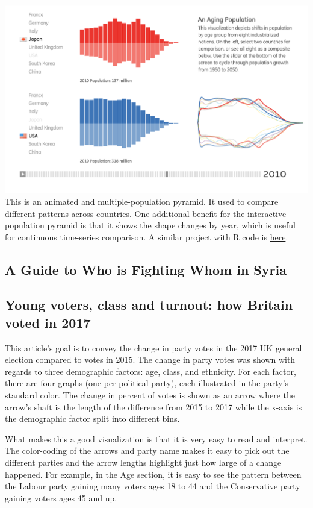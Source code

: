 \documentclass[]{book}
\theoremstyle{definition}
\theoremstyle{definition}
\theoremstyle{definition}
\theoremstyle{remark}
\begin{document}
\includegraphics{images/3_1.png} This is an animated and
multiple-population pyramid. It used to compare different patterns
across countries. One additional benefit for the interactive population
pyramid is that it shows the shape changes by year, which is useful for
continuous time-series comparison. A similar project with R code is
\href{https://www.r-bloggers.com/who-is-old-visualizing-the-concept-of-prospective-ageing-with-animated-population-pyramids/}{here}.

\subsection{A Guide to Who is Fighting Whom in
Syria}\label{a-guide-to-who-is-fighting-whom-in-syria}

\subsection{Young voters, class and turnout: how Britain voted in
2017}\label{young-voters-class-and-turnout-how-britain-voted-in-2017}

\citep{UKvotes2017} This article's goal is to convey the change in party
votes in the 2017 UK general election compared to votes in 2015. The
change in party votes was shown with regards to three demographic
factors: age, class, and ethnicity. For each factor, there are four
graphs (one per political party), each illustrated in the party's
standard color. The change in percent of votes is shown as an arrow
where the arrow's shaft is the length of the difference from 2015 to
2017 while the x-axis is the demographic factor split into different
bins.

What makes this a good visualization is that it is very easy to read and
interpret. The color-coding of the arrows and party name makes it easy
to pick out the different parties and the arrow lengths highlight just
how large of a change happened. For example, in the Age section, it is
easy to see the pattern between the Labour party gaining many voters
ages 18 to 44 and the Conservative party gaining voters ages 45 and up.
\end{document}

